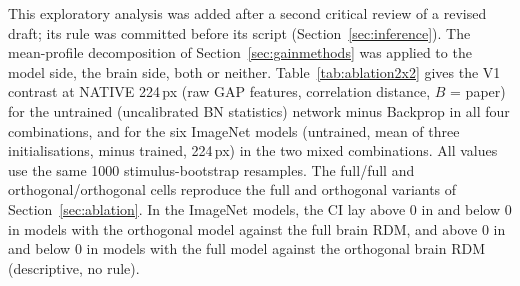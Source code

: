 This exploratory analysis was added after a second critical review of a revised draft; its
rule was committed before its script (Section~\ref{sec:inference}). The mean-profile
decomposition of Section~\ref{sec:gainmethods} was applied to the model side, the brain
side, both or neither. Table~\ref{tab:ablation2x2} gives the V1 contrast at NATIVE 224\,px
(raw GAP features, correlation distance, $B$ = paper) for the untrained (uncalibrated BN
statistics) network minus Backprop in all four combinations, and for the six ImageNet models
(untrained, mean of three initialisations, minus trained, 224\,px) in the two mixed
combinations. All values use the same 1000 stimulus-bootstrap resamples. The full/full and
orthogonal/orthogonal cells reproduce the full and orthogonal variants of
Section~\ref{sec:ablation}. In the ImageNet models, the CI lay above 0 in
\AbTwoImnOrthoFullPos{} and below 0 in \AbTwoImnOrthoFullNeg{} models with the orthogonal
model against the full brain RDM, and above 0 in \AbTwoImnFullOrthoPos{} and below 0 in
\AbTwoImnFullOrthoNeg{} models with the full model against the orthogonal brain RDM
(descriptive, no rule).


